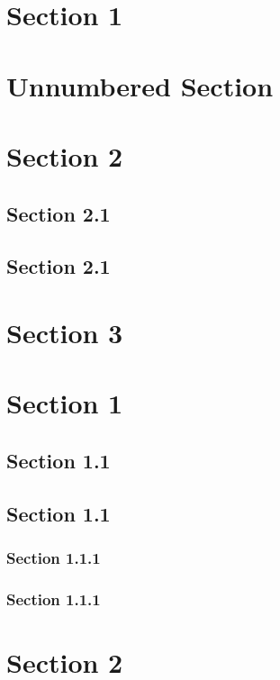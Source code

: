 \section{Section 1}
\hypertarget{_section_1}{}
\section*{Unnumbered Section}
\hypertarget{_unnumbered_section}{}
\section{Section 2}
\hypertarget{_section_2}{\subsection{Section 2.1}}
\subsection{Section 2.1}
\hypertarget{_section_2.1}{}
\section{Section 3}
\hypertarget{_section_3}{}

\section{Section 1}
\hypertarget{_section_1}{\subsection{Section 1.1}}
\subsection{Section 1.1}
\hypertarget{_section_1.1}{\subsubsection{Section 1.1.1}}
\subsubsection{Section 1.1.1}
\hypertarget{_section_1.1.1}{}
\section{Section 2}
\hypertarget{_section_2}{}
